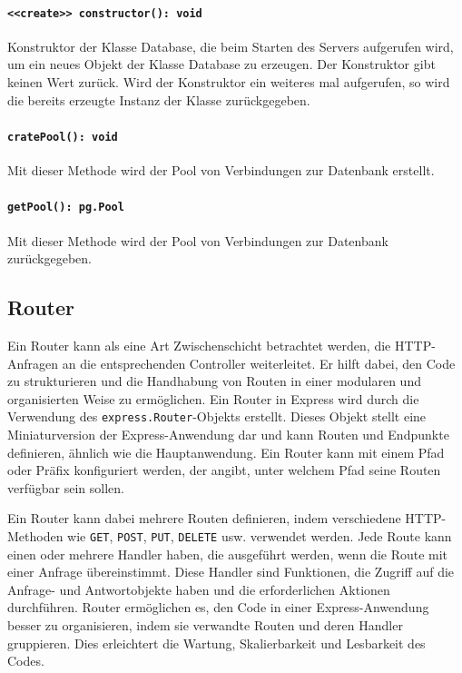 \documentclass{entwurfsheft}
\begin{document}
\paragraph{\texttt{<<create>> constructor(): void}}
Konstruktor der Klasse Database, die beim Starten des Servers aufgerufen wird, um ein neues Objekt der Klasse Database zu erzeugen. Der Konstruktor gibt keinen Wert zurück.
Wird der Konstruktor ein weiteres mal aufgerufen, so wird die bereits erzeugte Instanz der Klasse zurückgegeben.
\paragraph{\texttt{cratePool(): void}}
Mit dieser Methode wird der Pool von Verbindungen zur Datenbank erstellt.
\paragraph{\texttt{getPool(): pg.Pool}}
Mit dieser Methode wird der Pool von Verbindungen zur Datenbank zurückgegeben.


\subsection{Router}
Ein Router kann als eine Art Zwischenschicht betrachtet werden, die HTTP-Anfragen an die entsprechenden Controller weiterleitet.
Er hilft dabei, den Code zu strukturieren und die Handhabung von Routen in einer modularen und organisierten Weise zu ermöglichen.
Ein Router in Express wird durch die Verwendung des \texttt{express.Router}-Objekts erstellt.
Dieses Objekt stellt eine Miniaturversion der Express-Anwendung dar und kann Routen und Endpunkte definieren, ähnlich wie die Hauptanwendung.
Ein Router kann mit einem Pfad oder Präfix konfiguriert werden, der angibt, unter welchem Pfad seine Routen verfügbar sein sollen.

Ein Router kann dabei mehrere Routen definieren, indem verschiedene HTTP-Methoden wie \texttt{GET}, \texttt{POST}, \texttt{PUT}, \texttt{DELETE} usw. verwendet werden.
Jede Route kann einen oder mehrere Handler haben, die ausgeführt werden, wenn die Route mit einer Anfrage übereinstimmt.
Diese Handler sind Funktionen, die Zugriff auf die Anfrage- und Antwortobjekte haben und die erforderlichen Aktionen durchführen.
Router ermöglichen es, den Code in einer Express-Anwendung besser zu organisieren, indem sie verwandte Routen und deren Handler gruppieren.
Dies erleichtert die Wartung, Skalierbarkeit und Lesbarkeit des Codes.
\end{document}

